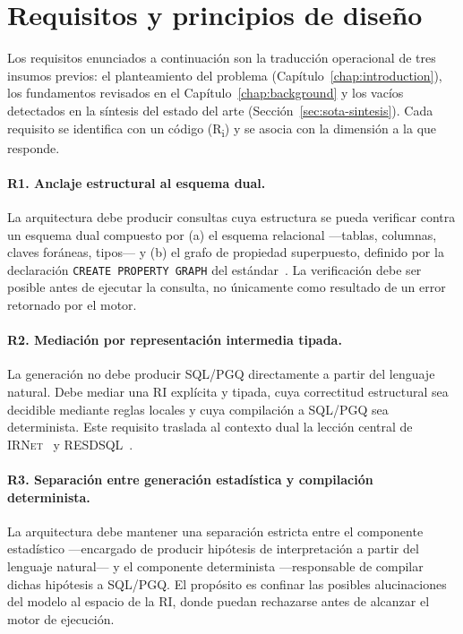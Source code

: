 \section{Requisitos y principios de diseño}
\label{sec:prop-requisitos}

Los requisitos enunciados a continuación son la traducción operacional de tres insumos previos: el planteamiento del problema (Capítulo~\ref{chap:introduction}), los fundamentos revisados en el Capítulo~\ref{chap:background} y los vacíos detectados en la síntesis del estado del arte (Sección~\ref{sec:sota-sintesis}). Cada requisito se identifica con un código (R\textsubscript{i}) y se asocia con la dimensión a la que responde.

\paragraph{R1. Anclaje estructural al esquema dual.} La arquitectura debe producir consultas cuya estructura se pueda verificar contra un esquema dual compuesto por (a) el esquema relacional ---tablas, columnas, claves foráneas, tipos--- y (b) el grafo de propiedad superpuesto, definido por la declaración \texttt{CREATE PROPERTY GRAPH} del estándar~\cite{ISO9075_16_2023, DuckPGQ}. La verificación debe ser posible antes de ejecutar la consulta, no únicamente como resultado de un error retornado por el motor.

\paragraph{R2. Mediación por representación intermedia tipada.} La generación no debe producir \ac{SQL}/\ac{PGQ} directamente a partir del lenguaje natural. Debe mediar una \ac{RI} explícita y tipada, cuya correctitud estructural sea decidible mediante reglas locales y cuya compilación a \ac{SQL}/\ac{PGQ} sea determinista. Este requisito traslada al contexto dual la lección central de \textsc{IRNet}~\cite{IRNet} y \textsc{RESDSQL}~\cite{RESDSQL2023}.

\paragraph{R3. Separación entre generación estadística y compilación determinista.} La arquitectura debe mantener una separación estricta entre el componente estadístico ---encargado de producir hipótesis de interpretación a partir del lenguaje natural--- y el componente determinista ---responsable de compilar dichas hipótesis a \ac{SQL}/\ac{PGQ}. El propósito es confinar las posibles alucinaciones del modelo al espacio de la \ac{RI}, donde puedan rechazarse antes de alcanzar el motor de ejecución.

